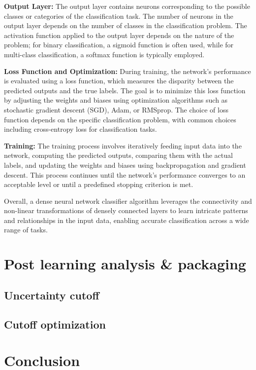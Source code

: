\documentclass[preprint,aps,nofootinbib,a4paper,superscriptaddress,longbibliography,amsfonts,amssymb,amsmath,titlepage]{revtex4-2}
\begin{document}
\textbf{Output Layer:} The output layer contains neurons corresponding to the possible classes or categories of the classification task. The number of neurons in the output layer depends on the number of classes in the classification problem. The activation function applied to the output layer depends on the nature of the problem; for binary classification, a sigmoid function is often used, while for multi-class classification, a softmax function is typically employed.

\textbf{Loss Function and Optimization:} During training, the network's performance is evaluated using a loss function, which measures the disparity between the predicted outputs and the true labels. The goal is to minimize this loss function by adjusting the weights and biases using optimization algorithms such as stochastic gradient descent (SGD), Adam, or RMSprop. The choice of loss function depends on the specific classification problem, with common choices including cross-entropy loss for classification tasks.

\textbf{Training:} The training process involves iteratively feeding input data into the network, computing the predicted outputs, comparing them with the actual labels, and updating the weights and biases using backpropagation and gradient descent. This process continues until the network's performance converges to an acceptable level or until a predefined stopping criterion is met.

Overall, a dense neural network classifier algorithm leverages the connectivity and non-linear transformations of densely connected layers to learn intricate patterns and relationships in the input data, enabling accurate classification across a wide range of tasks.

\section{Post learning analysis \& packaging}


\subsection{Uncertainty cutoff}


\subsection{Cutoff optimization}


\section{Conclusion}
\end{document}
